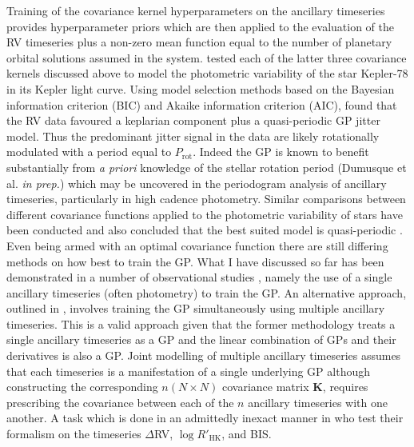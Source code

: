 Training of the covariance kernel hyperparameters 
on the ancillary timeseries provides hyperparameter priors which are then 
applied to the evaluation of the RV timeseries plus a non-zero mean function equal 
to the number of planetary orbital solutions assumed in the system. 
\cite{grunblatt15} tested each of the latter three covariance kernels discussed 
above to model the photometric variability of the 
star Kepler-78 in its Kepler light curve. 
Using model selection methods based on the Bayesian information criterion (BIC) 
and Akaike information criterion (AIC), \cite{grunblatt15} found that the RV data 
favoured a keplarian component plus a quasi-periodic GP jitter model. Thus the 
predominant jitter signal in the data are likely rotationally modulated with a 
period equal to $P_{\mathrm{rot}}$. 
Indeed the GP is known to benefit substantially from \emph{a priori} knowledge of 
the stellar rotation period (Dumusque et al. \emph{in prep.}) 
which may be uncovered in the periodogram analysis of 
ancillary timeseries, particularly in high cadence photometry. Similar comparisons 
between different covariance functions applied to the photometric variability of 
stars have been 
conducted and also concluded that the best suited model is quasi-periodic 
\parencite[e.g.][]{angus15}. \\

Even being armed with an optimal covariance function there are still differing 
methods on how best to train the GP. What I have discussed so far has been 
demonstrated in a number of observational studies 
\parencite[e.g.][]{haywood14, grunblatt15}, namely the use of a single 
ancillary timeseries (often photometry) to train the GP. An alternative approach, 
outlined in \cite{rajpaul15}, involves training the GP simultaneously using multiple 
ancillary timeseries. This is a valid approach given that the former methodology 
treats a single ancillary timeseries as a GP and the linear combination of GPs and 
their derivatives is also a GP. Joint modelling of multiple ancillary timeseries 
assumes that each timeseries is a manifestation of a single underlying GP although 
constructing the corresponding $n(N \times N)$ covariance matrix $\mathbf{K}$, 
requires prescribing the covariance 
between each of the $n$ ancillary timeseries with one another. A task which is 
done in an admittedly inexact manner in \cite{rajpaul15} who test their formalism 
on the timeseries $\Delta$RV, $\log{R'_{\mathrm{HK}}}$, and BIS. \\

